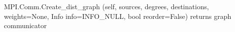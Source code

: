 MPI.Comm.Create_dist_graph
    (self, sources, degrees, destinations, weights=None, Info info=INFO_NULL, bool reorder=False)
returns graph communicator
